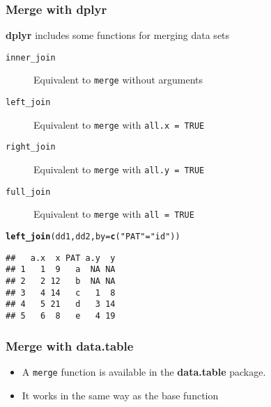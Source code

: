 \documentclass[paper=screen,mathserif]{beamer}\usepackage[]{graphicx}\usepackage[]{color}
\makeatletter
\newcommand{\hlstr}[1]{\textcolor[rgb]{0.192,0.494,0.8}{#1}}%
\newcommand{\hlstd}[1]{\textcolor[rgb]{0.345,0.345,0.345}{#1}}%
\newcommand{\hlkwc}[1]{\textcolor[rgb]{0.333,0.667,0.333}{#1}}%
\newcommand{\hlkwd}[1]{\textcolor[rgb]{0.737,0.353,0.396}{\textbf{#1}}}%
\newenvironment{kframe}{%
 \def\at@end@of@kframe{}%
 \ifinner\ifhmode%
  \def\at@end@of@kframe{\end{minipage}}%
  \begin{minipage}{\columnwidth}%
 \fi\fi%
 \def\FrameCommand##1{\hskip\@totalleftmargin \hskip-\fboxsep
 \colorbox{shadecolor}{##1}\hskip-\fboxsep
     \hskip-\linewidth \hskip-\@totalleftmargin \hskip\columnwidth}%
 \MakeFramed {\advance\hsize-\width
   \@totalleftmargin\z@ \linewidth\hsize
   \@setminipage}}%
 {\par\unskip\endMakeFramed%
 \at@end@of@kframe}
\newenvironment{knitrout}{}{} %
\newcommand{\ft}[1]{\frametitle{#1}}
\newenvironment{xframe}[1][]
{\begin{frame}[fragile,environment=xframe]
    \frametitle{#1}}
  {\end{frame}}
\makeatother
\begin{document}
\begin{xframe}
  \ft{Merge with {\bf dplyr}}
  
  {\bf dplyr} includes some functions for merging data sets
  \begin{description}
  \item[{\tt inner\_join}] Equivalent to {\tt merge} without arguments
  \item[{\tt left\_join}] Equivalent to {\tt merge} with {\tt all.x = TRUE}
  \item[{\tt right\_join}] Equivalent to {\tt merge} with {\tt all.y = TRUE}
  \item[{\tt full\_join}] Equivalent to {\tt merge} with {\tt all = TRUE}
  \end{description}

\begin{knitrout}\scriptsize
{}\color{fgcolor}\begin{kframe}
\begin{alltt}
\hlkwd{left_join}\hlstd{(dd1, dd2,} \hlkwc{by} \hlstd{=} \hlkwd{c}\hlstd{(}\hlstr{"PAT"} \hlstd{=} \hlstr{"id"}\hlstd{))}
\end{alltt}
\begin{verbatim}
##   a.x  x PAT a.y  y
## 1   1  9   a  NA NA
## 2   2 12   b  NA NA
## 3   4 14   c   1  8
## 4   5 21   d   3 14
## 5   6  8   e   4 19
\end{verbatim}
\end{kframe}
\end{knitrout}

\end{xframe}

\begin{xframe}
  \ft{Merge with {\bf data.table}}
  
  \begin{itemize}
  \item A {\tt merge} function is available in the {\bf data.table}
    package.
  \item It works in the same way as the base function
  \end{itemize}
\end{xframe}
\end{document}
